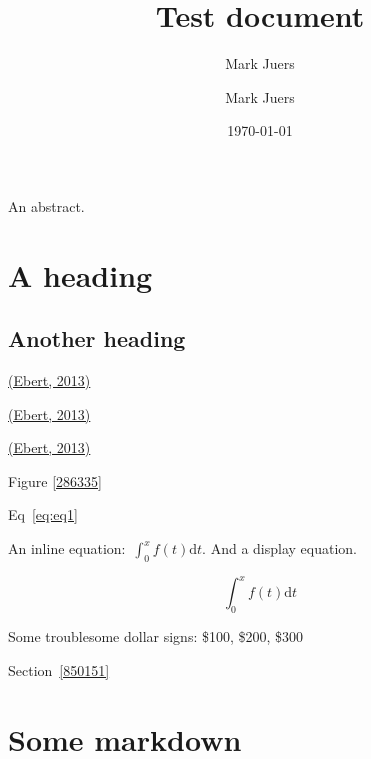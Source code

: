\documentclass[10pt]{article}
\author[1]{Mark Juers}
\affil[1]{Indiana University}
\renewenvironment{abstract}
  {{\bfseries\noindent{\abstractname}\par\nobreak}\footnotesize}
  {\bigskip}
\begin{document}
\title{Test document}



\author[1]{Mark Juers}%
%


\vspace{-1em}



  \date{\today}


\begingroup
\let\center\flushleft
\let\endcenter\endflushleft
\maketitle
\endgroup





\begin{abstract}
An abstract.%
\end{abstract}%




\section*{A heading}

{\label{850151}}

\subsection*{Another heading}

{\label{367935}}

\hyperref[csl:1]{(Ebert, 2013)}

\hyperref[csl:1]{(Ebert, 2013)}

\hyperref[csl:1]{(Ebert, 2013)}

Figure {\ref{286335}}

Eq~{\ref{eq:eq1}}

An inline equation:~\(\int_0^xf\left(t\right)\mathrm{d}t\). And a display equation.

\begin{equation}
\label{eq:eq1}
\int_0^x f(t) \mathrm{d}t
\end{equation}

Some troublesome dollar signs: \$100, \$200, \$300

Section~{\ref{850151}}

\section*{Some markdown}\label{some-markdown}
\end{document}
